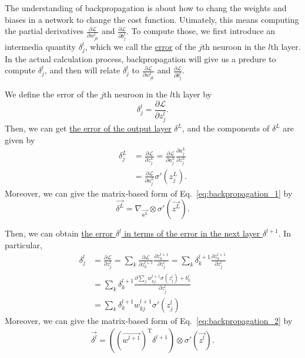 \documentclass[10pt,onecolumn]{book}
\begin{document}
The understanding of backpropagation is about how to chang the weights and biases in a network to change the cost function. Utimately, this means computing the partial derivatives $\frac{\partial \mathcal{L}}{\partial w^l_{jk}} $ and $\frac{\partial \mathcal{L}}{\partial b^l_j} $. To compute those, we first introduce an intermedia quantity $\delta^l_j$, which we call the \uline{error} of the $j$th neuroon in the $l$th layer. In the actual calculation process, backpropagation will give us a predure to compute $\delta^l_j$, and then will relate $\delta^l_j$ to $\frac{\partial \mathcal{L}}{\partial w^l_{jk}} $ and $\frac{\partial \mathcal{L}}{\partial b^l_j} $.

We define the error of the $j$th neuroon in the $l$th layer by
\begin{equation}
\delta^l_j = \frac{\partial \mathcal{L}}{\partial z^l_j}.
\end{equation}
Then, we can get \uline{the error of the output layer} $\delta^L$, and the components of $\delta^L$ are given by
\begin{equation}\label{eq:backpropagation_1}
\begin{split}
\delta^L_j & = \frac{\partial \mathcal{L}}{\partial z^L_j} 
		   = \frac{\partial \mathcal{L}}{\partial a^L_j}\frac{\partial a^L_j}{\partial z^L_j} \\
		   & = \frac{\partial \mathcal{L}}{\partial a^L_j} \sigma'(z^L_j).
\end{split}
\tag{BP1}
\end{equation}
Moreover, we can give the matrix-based form of Eq.~\ref{eq:backpropagation_1} by
\begin{equation}
\overrightarrow{\delta^L} = \nabla_{\overrightarrow{a^L}} \otimes \sigma'(\overrightarrow{z^L}).
\end{equation}

Then, we can obtain \uline{the error $\delta^l$ in terms of the error in the next layer $\delta^{l+1}$}. In particular, 
\begin{equation}\label{eq:backpropagation_2}
\begin{split}
\delta^l_j & = \frac{\partial \mathcal{L}}{\partial z^l_j} 
		    = \sum_k \frac{\partial \mathcal{L}}{\partial z^{l+1}_k} \frac{\partial z^{l+1}_k}{\partial z^l_j}
		    = \sum_k \delta^{l+1}_k \frac{\partial z^{l+1}_k}{\partial z^l_j} \\
		   & = \sum_k \delta^{l+1}_k \frac{\partial \sum_j w^{l+1}_{kj} \sigma(z^l_j) + b^l_k}{\partial z^l_j} \\
		   & = \sum_k \delta^{l+1}_k w^{l+1}_{kj} \sigma'(z^l_j)
\end{split}
\tag{BP2}
\end{equation}
Moreover, we can give the matrix-based form of Eq.~\ref{eq:backpropagation_2} by
\begin{equation}
\begin{split}
\overrightarrow{\delta^l} = ((\overrightarrow{w^{l+1}})^\mathrm{T}\delta^{l+1}) \otimes \sigma'(\overrightarrow{z^l}).
\end{split}
\end{equation}
\end{document}

